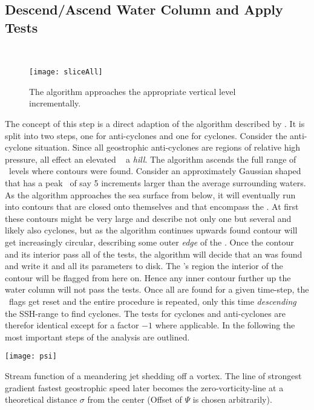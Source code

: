 \subsection{Descend/Ascend Water Column and Apply Tests}
 \\
\begin{figure}
	\texttt{[image: sliceAll]}
	\caption{The algorithm approaches the appropriate vertical level incrementally.}
	\label{fig:sliceAll}
\end{figure}
The concept of this step is a direct adaption of the algorithm described
by \citet{Chelton2011}. It is split into two steps, one for anti-cyclones and one
for cyclones. Consider \eg the anti-cyclone situation. Since all
geostrophic anti-cyclones are regions of relative high pressure, all
\ACs effect an elevated \SSH~\ie
a \textit{hill}. The algorithm ascends the full range of \SSH~levels where
contours were found. Consider an approximately Gaussian shaped \AC that has a
peak \SSH~of say 5 increments larger than the average surrounding waters.
As the algorithm approaches the sea surface from below, it will eventually run
into contours that are closed onto themselves and that encompass the \AC. At
first these contours might be very large and describe not only one but several
\ACs and likely also cyclones, but as the algorithm continues upwards found
contour will get increasingly circular, describing some outer \textit{edge} of
the \AC. Once the contour and its interior pass all of the tests, the algorithm
will decide that an \AC was found and write it and all its parameters to disk.
The \AC's region \ie the interior of the contour will be flagged from here on.
Hence any inner contour further up the water column will not pass the tests.
Once all \ACs are found for a given time-step, the \SSH~flags get reset and the
entire procedure is repeated, only this time \textit{descending} the SSH-range to
find cyclones. The tests for cyclones and anti-cyclones are therefor identical except for
a factor $-1$ where applicable. In the following the most important steps of the
analysis are
outlined.
\begin{marginfigure}
	\texttt{[image: psi]}
	\caption{Stream function of a meandering jet shedding off a vortex. The line of strongest gradient \ie fastest geostrophic speed later becomes the zero-vorticity-line at a theoretical distance $\sigma$ from the center (Offset of $\Psi$ is chosen arbitrarily).}
	\label{fig:psi}
\end{marginfigure}
